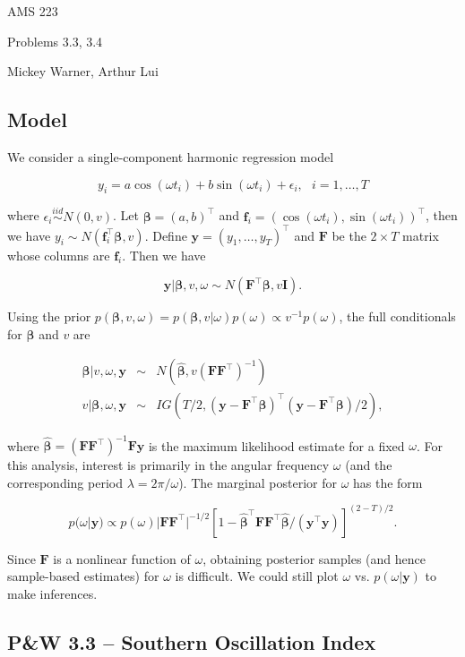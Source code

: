 \documentclass[12pt]{article}
\newcommand{\m}[1]{\mathbf{\bm{#1}}}
\begin{document}
\noindent AMS 223

\noindent Problems 3.3, 3.4

\noindent Mickey Warner, Arthur Lui

\subsection*{Model}

\noindent We consider a single-component harmonic regression model

\[ y_i = a\cos(\omega t_i) + b\sin(\omega t_i) +\epsilon_i,~~~i=1,\ldots,T \]

\noindent where $\epsilon_i\overset{iid}{\sim}N(0,v)$. Let $\m{\beta}=(a,b)^\top$ and $\m{f}_i=(\cos(\omega t_i), \sin(\omega t_i))^\top$, then we have $y_i\sim N(\m{f}_i^\top \m{\beta}, v)$. Define $\m{y}=(y_1,\ldots,y_T)^\top$ and $\m{F}$ be the $2\times T$ matrix whose columns are $\m{f}_i$. Then we have

\[ \m{y}|\m{\beta},v,\omega \sim N\left(\m{F}^\top \m{\beta}, v\m{I}\right). \]

\noindent Using the prior $p(\m{\beta},v,\omega)=p(\m{\beta},v|\omega)p(\omega) \propto v^{-1}p(\omega)$, the full conditionals for $\m{\beta}$ and $v$ are

\begin{eqnarray*}
\m{\beta}|v,\omega,\m{y} &\sim& N\left(\hat{\m{\beta}}, v(\m{F}\m{F}^\top)^{-1}\right)  \\
v|\m{\beta},\omega,\m{y} &\sim& IG\left(T/2, (\m{y}-\m{F}^\top\m{\beta})^\top(\m{y}-\m{F}^\top\m{\beta})/2\right),
\end{eqnarray*}

\noindent where $\hat{\m{\beta}}=(\m{F}\m{F}^\top)^{-1}\m{F}\m{y}$ is the maximum likelihood estimate for a fixed $\omega$. For this analysis, interest is primarily in the angular frequency $\omega$ (and the corresponding period $\lambda=2\pi/\omega$). The marginal posterior for $\omega$ has the form

\[ p(\omega|\m{y}) \propto p(\omega)|\m{F}\m{F}^\top|^{-1/2}\left[1-\hat{\m{\beta}}^\top\m{F}\m{F}^\top\hat{\m{\beta}}/(\m{y}^\top\m{y})\right]^{(2-T)/2}. \]

\noindent Since $\m{F}$ is a nonlinear function of $\omega$, obtaining posterior samples (and hence sample-based estimates) for $\omega$ is difficult. We could still plot $\omega$ vs. $p(\omega|\m{y})$ to make inferences. 

\subsection*{P\&W 3.3 -- Southern Oscillation Index}
\end{document}
